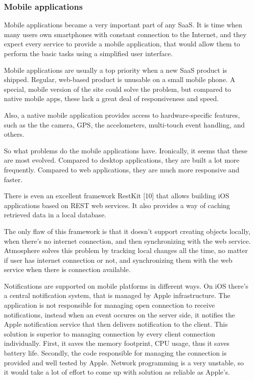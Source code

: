 \subsubsection{Mobile applications}

Mobile applications became a very important part of any SaaS. It is time when many users own smartphones with constant connection to the Internet, and they expect every service to provide a mobile application, that would allow them to perform the basic  tasks using a simplified user interface. 

Mobile applications are usually a top priority when a new SaaS product is shipped. Regular, web-based product is unusable on a small mobile phone. A special, mobile version of the site could solve the problem, but compared to native mobile apps, these lack a great deal of responsiveness and speed.

Also, a native mobile application provides access to hardware-specific features, such as the the camera, GPS, the accelometers, multi-touch event handling, and others. 

So what problems do the mobile applications have. Ironically, it seems that these are most evolved. Compared to desktop applications, they are built a lot more frequently. Compared to web applications, they are much more responsive and faster. 

There is even an excellent framework RestKit [10] that allows building iOS applications based on REST web services. It also provides a way of caching retrieved data in a local database.

The only flaw of this framework is that it doesn’t support creating objects locally, when there’s no internet connection, and then synchronizing with the web service. Atmosphere solves this problem by tracking local changes all the time, no matter if user has internet connection or not, and synchronizing them with the web service when there is connection available.

Notifications are supported on mobile platforms in different ways. On iOS there’s a central notification system, that is managed by Apple infrastructure. The application is not responsible for managing open connection to receive notifications, instead when an event occures on the server side, it notifies the Apple notification service that then delivers notification to the client. This solution is superior to managing connection by every client connection individually. First, it saves the memory footprint, CPU usage, thus it saves battery life. Secondly, the code responsible for managing the connection is provided and well tested by Apple. Network programming is a very unstable, so it would take a lot of effort to come up with solution as reliable as Apple’s. 

